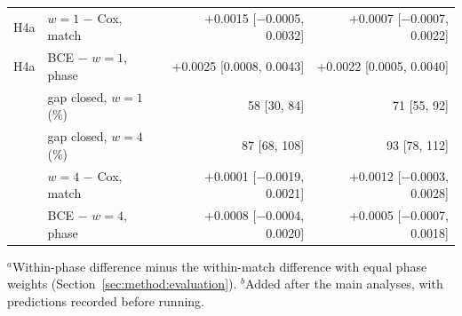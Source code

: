 \begin{table}[t]
\begin{tabular}{@{}llrr@{}}
H4a & $w{=}1$ $-$ Cox, match & $+$0.0015 {\scriptsize[$-$0.0005, 0.0032]} & $+$0.0007 {\scriptsize[$-$0.0007, 0.0022]} \\
H4a & BCE $-$ $w{=}1$, phase & $+$0.0025 {\scriptsize[0.0008, 0.0043]} & $+$0.0022 {\scriptsize[0.0005, 0.0040]} \\
 & gap closed, $w{=}1$ (\%) & 58 {\scriptsize[30, 84]} & 71 {\scriptsize[55, 92]} \\
 & gap closed, $w{=}4$ (\%) & 87 {\scriptsize[68, 108]} & 93 {\scriptsize[78, 112]} \\
 & $w{=}4$ $-$ Cox, match & $+$0.0001 {\scriptsize[$-$0.0019, 0.0021]} & $+$0.0012 {\scriptsize[$-$0.0003, 0.0028]} \\
 & BCE $-$ $w{=}4$, phase & $+$0.0008 {\scriptsize[$-$0.0004, 0.0020]} & $+$0.0005 {\scriptsize[$-$0.0007, 0.0018]} \\
\bottomrule
\end{tabular}
\smallskip
\parbox{\columnwidth}{\scriptsize $^{a}$Within-phase difference minus the within-match difference with equal phase weights (Section~\ref{sec:method:evaluation}). $^{b}$Added after the main analyses, with predictions recorded before running.}
\end{table}
